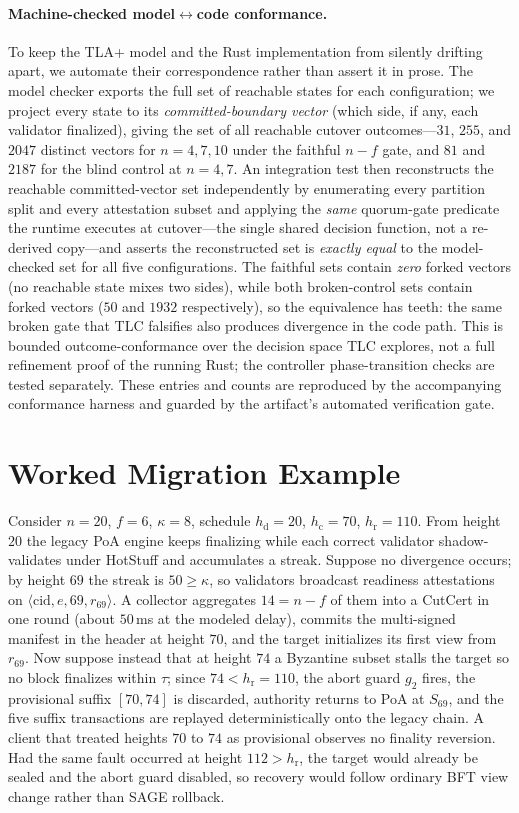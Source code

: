 \documentclass[journal]{IEEEtran}
\theoremstyle{definition}
\theoremstyle{remark}
\begin{document}
\paragraph{Machine-checked model$\leftrightarrow$code conformance.}
To keep the TLA+ model and the Rust implementation from silently drifting apart, we automate their
correspondence rather than assert it in prose. The model checker exports the full set
of reachable states for each configuration; we project every state to its \emph{committed-boundary
vector} (which side, if any, each validator finalized), giving the set of all reachable cutover
outcomes---$31$, $255$, and $2047$ distinct vectors for $n=4,7,10$ under the faithful $n{-}f$ gate,
and $81$ and $2187$ for the blind control at $n=4,7$. An integration test then reconstructs the
reachable committed-vector set independently by enumerating every partition split and every
attestation subset and applying the \emph{same} quorum-gate predicate the runtime executes at
cutover---the single shared decision function, not a re-derived
copy---and asserts the reconstructed set is \emph{exactly equal} to the model-checked set for all
five configurations. The faithful sets contain \emph{zero} forked vectors (no reachable state mixes
two sides), while both broken-control sets contain forked vectors ($50$ and $1932$ respectively),
so the equivalence has teeth: the same broken gate that TLC falsifies also produces divergence in
the code path. This is bounded outcome-conformance over the decision space TLC explores, not a full
refinement proof of the running Rust; the controller phase-transition checks are tested separately. These
entries and counts are reproduced by the accompanying conformance harness and guarded by the
artifact's automated verification gate.

\section{Worked Migration Example}
\label{app:example}
Consider $n=20$, $f=6$, $\kappa=8$, schedule $h_{\mathrm{d}}=20$, $h_{\mathrm{c}}=70$,
$h_{\mathrm{r}}=110$. From height $20$ the legacy PoA engine keeps finalizing while each correct
validator shadow-validates under HotStuff and accumulates a streak. Suppose no divergence
occurs; by height $69$ the streak is $50\ge\kappa$, so validators broadcast readiness
attestations on $\langle\mathrm{cid},e,69,r_{69}\rangle$. A collector aggregates $14=n-f$ of them
into a CutCert in one round (about $50$\,ms at the modeled delay), commits the multi-signed
manifest in the header at height $70$, and the target initializes its first view from $r_{69}$.
Now suppose instead that at height $74$ a Byzantine subset stalls the target so no block
finalizes within $\tau$; since $74<h_{\mathrm{r}}=110$, the abort guard $g_2$ fires, the
provisional suffix $[70,74]$ is discarded, authority returns to PoA at $S_{69}$, and the five
suffix transactions are replayed deterministically onto the legacy chain. A client that treated
heights $70$ to $74$ as provisional observes no finality reversion. Had the same fault occurred at
height $112>h_{\mathrm{r}}$, the target would already be sealed and the abort guard disabled, so
recovery would follow ordinary BFT view change rather than SAGE rollback.
\end{document}
